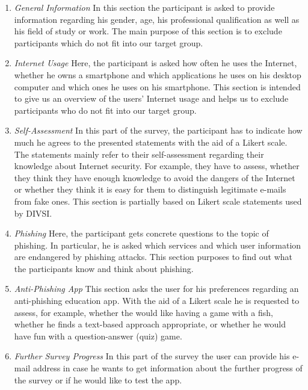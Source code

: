 \begin{enumerate}
	\item \textit{General Information} In this section the participant is asked to provide information regarding his gender, age, his professional qualification as well as his field of study or work.
 The main purpose of this section is to exclude participants which do not fit into our target group.

	\item \textit{Internet Usage} Here, the participant is asked how often he uses the Internet, whether he owns a smartphone and which applications he uses on his desktop computer and which ones he uses on his smartphone.
 This section is intended to give us an overview of the users' Internet usage and helps us to exclude participants who do not fit into our target group.

	\item \textit{Self-Assessment} In this part of the survey, the participant has to indicate how much he agrees to the presented statements with the aid of a Likert scale.
 The statements mainly refer to their self-assessment regarding their knowledge about Internet security.
 For example, they have to assess, whether they think they have enough knowledge to avoid the dangers of the Internet or whether they think it is easy for them to distinguish legitimate e-mails from fake ones.
 This section is partially based on Likert scale statements used by DIVSI\cite{divsi2012divsi}.
	\item \textit{Phishing} Here, the participant gets concrete questions to the topic of phishing.
 In particular, he is asked which services and which user information are endangered by phishing attacks.
 This section purposes to find out what the participants know and think about phishing.

	\item \textit{Anti-Phishing App} This section asks the user for his preferences regarding an anti-phishing education app.
 With the aid of a Likert scale he is requested to assess, for example, whether the would like having a game with a fish, whether he finds a text-based approach appropriate, or whether he would have fun with a question-answer (quiz) game.

	\item \textit{Further Survey Progress} In this part of the survey the user can provide his e-mail address in case he wants to get information about the further progress of the survey or if he would like to test the app.

\end{enumerate}

